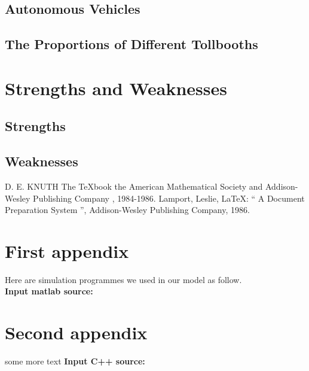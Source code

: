 \documentclass{mcmthesis}
\begin{document}
\subsection{Autonomous Vehicles}
\subsection{The Proportions of Different Tollbooths}

\section{Strengths and Weaknesses}
\subsection{Strengths}
\subsection{Weaknesses}

\begin{thebibliography}{99}
 D. E. KNUTH   The \TeX{}book  the American
Mathematical Society and Addison-Wesley
Publishing Company , 1984-1986.
Lamport, Leslie,  \LaTeX{}: `` A Document Preparation System '',
Addison-Wesley Publishing Company, 1986.

\end{thebibliography}

\begin{appendices}

\section{First appendix}


Here are simulation programmes we used in our model as follow.\\

\textbf{\textcolor[rgb]{0.98,0.00,0.00}{Input matlab source:}}


\section{Second appendix}

some more text \textcolor[rgb]{0.98,0.00,0.00}{\textbf{Input C++ source:}}


\end{appendices}
\end{document}
